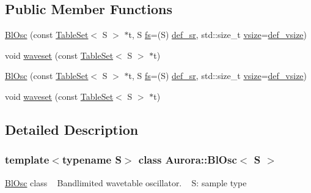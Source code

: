 \subsection*{Public Member Functions}
\begin{DoxyCompactItemize}
\item 
\hyperlink{class_aurora_1_1_bl_osc_a1159b66d0a05dfd677cde07f5547c257}{Bl\+Osc} (const \hyperlink{class_aurora_1_1_table_set}{Table\+Set}$<$ S $>$ $\ast$t, S \hyperlink{class_aurora_1_1_osc_a9ac3aa9006fc98588b2163e0e56f6e30}{fs}=(S) \hyperlink{namespace_aurora_ad49263d809bea98dd422e95bc91bc03e}{def\+\_\+sr}, std\+::size\+\_\+t \hyperlink{class_aurora_1_1_snd_base_af9e21aaf411b17f7a8221c991ce5d291}{vsize}=\hyperlink{namespace_aurora_afaaddf667a06e7ce23c667a8b7295263}{def\+\_\+vsize})
\item 
void \hyperlink{class_aurora_1_1_bl_osc_a7506391ee84bdd698904e4c0f14c446e}{waveset} (const \hyperlink{class_aurora_1_1_table_set}{Table\+Set}$<$ S $>$ $\ast$t)
\item 
\hyperlink{class_aurora_1_1_bl_osc_a1159b66d0a05dfd677cde07f5547c257}{Bl\+Osc} (const \hyperlink{class_aurora_1_1_table_set}{Table\+Set}$<$ S $>$ $\ast$t, S \hyperlink{class_aurora_1_1_osc_a9ac3aa9006fc98588b2163e0e56f6e30}{fs}=(S) \hyperlink{namespace_aurora_ad49263d809bea98dd422e95bc91bc03e}{def\+\_\+sr}, std\+::size\+\_\+t \hyperlink{class_aurora_1_1_snd_base_af9e21aaf411b17f7a8221c991ce5d291}{vsize}=\hyperlink{namespace_aurora_afaaddf667a06e7ce23c667a8b7295263}{def\+\_\+vsize})
\item 
void \hyperlink{class_aurora_1_1_bl_osc_a7506391ee84bdd698904e4c0f14c446e}{waveset} (const \hyperlink{class_aurora_1_1_table_set}{Table\+Set}$<$ S $>$ $\ast$t)
\end{DoxyCompactItemize}


\subsection{Detailed Description}
\subsubsection*{template$<$typename S$>$\newline
class Aurora\+::\+Bl\+Osc$<$ S $>$}

\hyperlink{class_aurora_1_1_bl_osc}{Bl\+Osc} class ~\newline
Bandlimited wavetable oscillator. ~\newline
S\+: sample type

